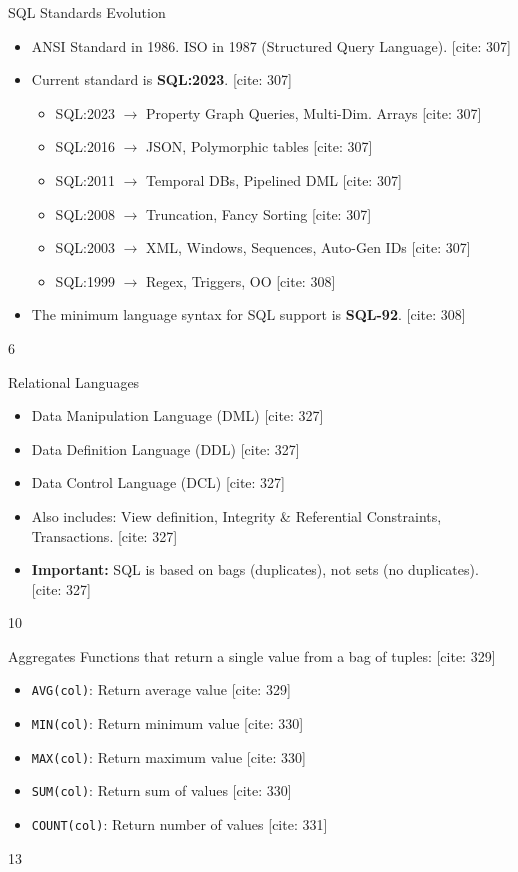 \documentclass{beamer}
\begin{document}
\begin{frame}{SQL Standards Evolution}
    \begin{itemize}
        \item ANSI Standard in 1986. ISO in 1987 (Structured Query Language). [cite: 307]
        \item Current standard is \textbf{SQL:2023}. [cite: 307]
        \begin{itemize}
            \item SQL:2023 $\rightarrow$ Property Graph Queries, Multi-Dim. Arrays [cite: 307]
            \item SQL:2016 $\rightarrow$ JSON, Polymorphic tables [cite: 307]
            \item SQL:2011 $\rightarrow$ Temporal DBs, Pipelined DML [cite: 307]
            \item SQL:2008 $\rightarrow$ Truncation, Fancy Sorting [cite: 307]
            \item SQL:2003 $\rightarrow$ XML, Windows, Sequences, Auto-Gen IDs [cite: 307]
            \item SQL:1999 $\rightarrow$ Regex, Triggers, OO [cite: 308]
        \end{itemize}
        \item The minimum language syntax for SQL support is \textbf{SQL-92}. [cite: 308]
    \end{itemize}
    \vfill
    \hfill 6
\end{frame}

\begin{frame}{Relational Languages}
    \begin{itemize}
        \item Data Manipulation Language (DML) [cite: 327]
        \item Data Definition Language (DDL) [cite: 327]
        \item Data Control Language (DCL) [cite: 327]
        \item Also includes: View definition, Integrity \& Referential Constraints, Transactions. [cite: 327]
        \item \textbf{Important:} SQL is based on bags (duplicates), not sets (no duplicates). [cite: 327]
    \end{itemize}
    \vfill
    \hfill 10
\end{frame}

\begin{frame}{Aggregates}
    Functions that return a single value from a bag of tuples: [cite: 329]
    \begin{itemize}
        \item \texttt{AVG(col)}: Return average value [cite: 329]
        \item \texttt{MIN(col)}: Return minimum value [cite: 330]
        \item \texttt{MAX(col)}: Return maximum value [cite: 330]
        \item \texttt{SUM(col)}: Return sum of values [cite: 330]
        \item \texttt{COUNT(col)}: Return number of values [cite: 331]
    \end{itemize}
    \vfill
    \hfill 13
\end{frame}
\end{document}
